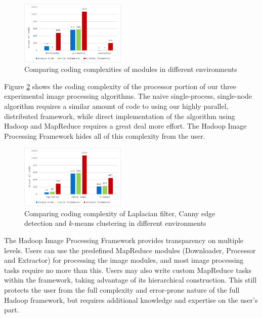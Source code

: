 \documentclass[conference]{IEEEtran}
\begin{document}
\begin{figure}[h]
  \centering
  \includegraphics[width=0.45\textwidth]{module-chart2}
  \caption{Comparing coding complexities of modules in different
    environments}
  \label{fig:module-chart}
\end{figure}

Figure \ref{fig:comp-chart} shows the coding complexity of the
processor portion of our three experimental image processing
algorithms.  The naive single-process, single-node algorithm requires
a similar amount of code to using our highly parallel, distributed
framework, while direct implementation of the algorithm using Hadoop
and MapReduce requires a great deal more effort.  The Hadoop Image
Processing Framework hides all of this complexity from the user.

\begin{figure}[h]
  \centering
  \includegraphics[width=0.45\textwidth]{comp-chart}
  \caption{Comparing coding complexity of Laplacian filter,
    Canny edge detection and $k$-means clustering in different
    environments}
  \label{fig:comp-chart}
\end{figure}

The Hadoop Image Processing Framework provides transparency on
multiple levels.  Users can use the predefined MapReduce modules
(Downloader, Processor and Extractor) for processing the image
modules, and most image processing tasks require no more than this.
Users may also write custom MapReduce tasks within the framework,
taking advantage of its hierarchical construction.  This still
protects the user from the full complexity and error-prone nature of
the full Hadoop framework, but requires additional knowledge and
expertise on the user's part.
\end{document}
